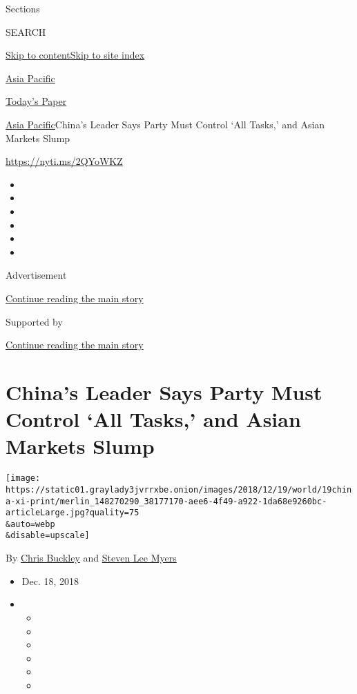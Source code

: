 Sections

SEARCH

\protect\hyperlink{site-content}{Skip to
content}\protect\hyperlink{site-index}{Skip to site index}

\href{https://www.nytimes3xbfgragh.onion/section/world/asia}{Asia
Pacific}

\href{https://myaccount.nytimes3xbfgragh.onion/auth/login?response_type=cookie\&client_id=vi}{}

\href{https://www.nytimes3xbfgragh.onion/section/todayspaper}{Today's
Paper}

\href{/section/world/asia}{Asia Pacific}\textbar{}China's Leader Says
Party Must Control `All Tasks,' and Asian Markets Slump

\url{https://nyti.ms/2QYoWKZ}

\begin{itemize}
\item
\item
\item
\item
\item
\item
\end{itemize}

Advertisement

\protect\hyperlink{after-top}{Continue reading the main story}

Supported by

\protect\hyperlink{after-sponsor}{Continue reading the main story}

\hypertarget{chinas-leader-says-party-must-control-all-tasks-and-asian-markets-slump}{%
\section{China's Leader Says Party Must Control `All Tasks,' and Asian
Markets
Slump}\label{chinas-leader-says-party-must-control-all-tasks-and-asian-markets-slump}}

\texttt{[image: https://static01.graylady3jvrrxbe.onion/images/2018/12/19/world/19china-xi-print/merlin\_148270290\_38177170-aee6-4f49-a922-1da68e9260bc-articleLarge.jpg?quality=75\\\&auto=webp\\\&disable=upscale]}

By \href{https://www.nytimes3xbfgragh.onion/by/chris-buckley}{Chris
Buckley} and
\href{https://www.nytimes3xbfgragh.onion/by/steven-lee-myers}{Steven Lee
Myers}

\begin{itemize}
\item
  Dec. 18, 2018
\item
  \begin{itemize}
  \item
  \item
  \item
  \item
  \item
  \item
  \end{itemize}
\end{itemize}

